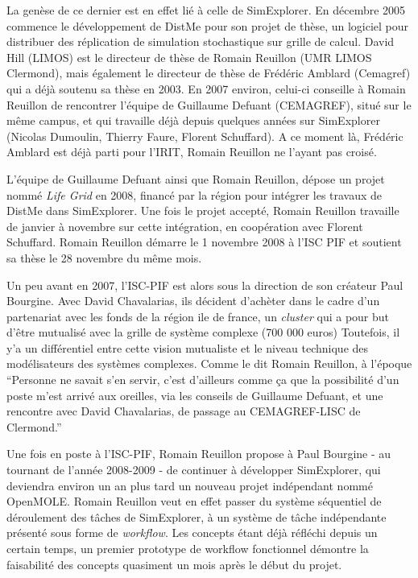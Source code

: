 La genèse de ce dernier est en effet lié à celle de SimExplorer. En décembre 2005 \textcite{Reuillon2008} commence le développement de DistMe pour son projet de thèse, un logiciel pour distribuer des réplication de simulation stochastique sur grille de calcul. David Hill (LIMOS) est le directeur de thèse de Romain Reuillon (UMR LIMOS Clermond), mais également le directeur de thèse de Frédéric Amblard (Cemagref) qui a déjà soutenu sa thèse en 2003. En 2007 environ, celui-ci conseille à Romain Reuillon de rencontrer l'équipe de Guillaume Defuant (CEMAGREF), situé sur le même campus, et qui travaille déjà depuis quelques années sur SimExplorer (Nicolas Dumoulin, Thierry Faure, Florent Schuffard). A ce moment là, Frédéric Amblard est déjà parti pour l'IRIT, Romain Reuillon ne l'ayant pas croisé.

L'équipe de Guillaume Defuant ainsi que Romain Reuillon, dépose un projet nommé \textit{Life Grid} en 2008, financé par la région pour intégrer les travaux de DistMe dans SimExplorer. Une fois le projet accepté, Romain Reuillon travaille de janvier à novembre sur cette intégration, en coopération avec Florent Schuffard. Romain Reuillon démarre le 1 novembre 2008 à l'ISC PIF et soutient sa thèse le 28 novembre du même mois.

Un peu avant en 2007, l'ISC-PIF est alors sous la direction de son créateur Paul Bourgine. Avec David Chavalarias, ils décident d'achèter dans le cadre d'un partenariat avec les fonds de la région ile de france, un \textit{cluster} qui a pour but d'être mutualisé avec la grille de système complexe (700 000 euros) Toutefois, il y'a un différentiel entre cette vision mutualiste et le niveau technique des modélisateurs des systèmes complexes. Comme le dit Romain Reuillon, à l'époque \enquote{Personne ne savait s'en servir, c'est d'ailleurs comme ça que la possibilité d'un poste m'est arrivé aux oreilles, via les conseils de Guillaume Defuant, et une rencontre avec David Chavalarias, de passage au CEMAGREF-LISC de Clermond.}

Une fois en poste à l'ISC-PIF, Romain Reuillon propose à Paul Bourgine - au tournant de l'année 2008-2009 - de continuer à développer SimExplorer, qui deviendra environ un an plus tard un nouveau projet indépendant nommé OpenMOLE. Romain Reuillon veut en effet passer du système séquentiel de déroulement des tâches de SimExplorer, à un système de tâche indépendante présenté sous forme de \textit{workflow}. Les concepts étant déjà réfléchi depuis un certain temps, un premier prototype de workflow fonctionnel démontre la faisabilité des concepts quasiment un mois après le début du projet.

